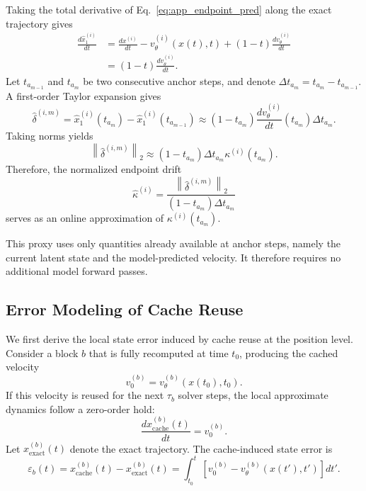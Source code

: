 Taking the total derivative of Eq.~\eqref{eq:app_endpoint_pred} along the exact trajectory gives
\begin{align}
    \frac{d \hat{x}_1^{(i)}}{dt}
    &=
    \frac{d x^{(i)}}{dt}
    -
    v_\theta^{(i)}(x(t),t)
    +
    (1-t)
    \frac{d v_\theta^{(i)}}{dt}
    \nonumber \\
    &=
    (1-t)
    \frac{d v_\theta^{(i)}}{dt}.
    \label{eq:app_endpoint_derivative}
\end{align}
Let $t_{a_{m-1}}$ and $t_{a_m}$ be two consecutive anchor steps, and denote $\Delta t_{a_m}=t_{a_m}-t_{a_{m-1}}$. A first-order Taylor expansion gives
\begin{equation}
    \hat{\delta}^{(i,m)}
    =
    \hat{x}_1^{(i)}(t_{a_m})
    -
    \hat{x}_1^{(i)}(t_{a_{m-1}})
    \approx
    (1-t_{a_m})
    \frac{d v_\theta^{(i)}}{dt}(t_{a_m})
    \Delta t_{a_m}.
\end{equation}
Taking norms yields
\begin{equation}
    \left\|
    \hat{\delta}^{(i,m)}
    \right\|_2
    \approx
    (1-t_{a_m})
    \Delta t_{a_m}
    \kappa^{(i)}(t_{a_m}).
    \label{eq:app_drift_curvature_relation}
\end{equation}
Therefore, the normalized endpoint drift
\begin{equation}
    \hat{\kappa}^{(i)}
    =
    \frac{
    \left\|
    \hat{\delta}^{(i,m)}
    \right\|_2
    }{
    (1-t_{a_m})\Delta t_{a_m}
    }
    \label{eq:app_kappa_estimator}
\end{equation}
serves as an online approximation of $\kappa^{(i)}(t_{a_m})$.

This proxy uses only quantities already available at anchor steps, namely the current latent state and the model-predicted velocity. It therefore requires no additional model forward passes. 





\subsection{Error Modeling of Cache Reuse}
\label{app:error_modeling}

We first derive the local state error induced by cache reuse at the
position level. Consider a block $b$ that is fully recomputed at time
$t_0$, producing the cached velocity
\begin{equation}
    v_0^{(b)} = v_\theta^{(b)}(x(t_0),t_0).
\end{equation}
If this velocity is reused for the next $\tau_b$ solver steps, the local
approximate dynamics follow a zero-order hold:
\begin{equation}
    \frac{dx_{\textrm{cache}}^{(b)}(t)}{dt}=v_0^{(b)}.
\end{equation}
Let $x_{\textrm{exact}}^{(b)}(t)$ denote the exact trajectory. The cache-induced state
error is
\begin{equation}
    \varepsilon_b(t)
    =
   x_{\textrm{cache}}^{(b)}(t)-x_{\textrm{exact}}^{(b)}(t)
    =
    \int_{t_0}^{t}
    \left[
    v_0^{(b)}-v_\theta^{(b)}(x(t'),t')
    \right]dt'.
\end{equation}

